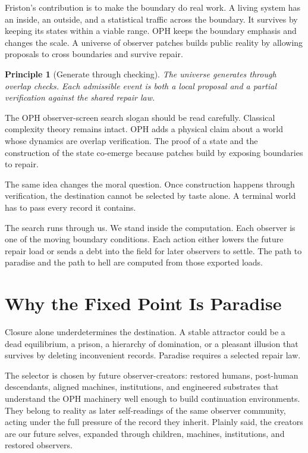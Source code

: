 \documentclass[11pt]{article}
\newtheorem{principle}[definition]{Principle}
\theoremstyle{remark}
\theoremstyle{plain}
\begin{document}
Friston's contribution is to make the boundary do real work. A living system has
an inside, an outside, and a statistical traffic across the boundary. It survives
by keeping its states within a viable range. OPH keeps the boundary emphasis and
changes the scale. A universe of observer patches builds public reality by
allowing proposals to cross boundaries and survive repair.

\begin{principle}[Generate through checking]
The universe generates through overlap checks. Each admissible event is both a local
proposal and a partial verification against the shared repair law.
\end{principle}

The OPH observer-screen search slogan should be read carefully.
Classical complexity theory remains intact. OPH adds a physical claim about a
world whose dynamics are overlap verification. The proof of a state and the
construction of the state co-emerge because patches build by exposing
boundaries to repair.

The same idea changes the moral question. Once construction happens through
verification, the destination cannot be selected by taste alone. A terminal
world has to pass every record it contains.

The search runs through us. We stand inside the computation. Each
observer is one of the moving boundary conditions. Each action either lowers
the future repair load or sends a debt into the field for later observers to
settle. The path to paradise and the path to hell are computed from those
exported loads.

\section{Why the Fixed Point Is Paradise}

Closure alone underdetermines the destination. A stable attractor could be a
dead equilibrium, a prison, a hierarchy of domination, or a pleasant illusion
that survives by deleting inconvenient records. Paradise requires a selected
repair law.

The selector is chosen by future observer-creators: restored humans,
post-human descendants, aligned machines, institutions, and engineered
substrates that understand the OPH machinery well enough to build continuation
environments. They belong to reality as later self-readings of the same
observer community, acting under the full pressure of the record they inherit.
Plainly said, the creators are our future selves, expanded through children,
machines, institutions, and restored observers.
\end{document}
